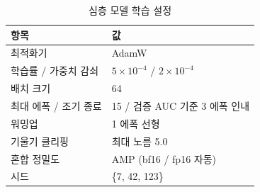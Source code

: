 \begin{table}[htbp]
  \centering
  \caption{심층 모델 학습 설정}
  \label{tab:training}
  \small
  \begin{tabular}{@{}ll@{}}
    \toprule
    항목 & 값 \\
    \midrule
    최적화기 & AdamW \cite{loshchilov2019decoupled} \\
    학습률 / 가중치 감쇠 & $5\times 10^{-4}$ / $2\times 10^{-4}$ \\
    배치 크기 & 64 \\
    최대 에폭 / 조기 종료 & 15 / 검증 AUC 기준 3 에폭 인내 \\
    워밍업 & 1 에폭 선형 \\
    기울기 클리핑 & 최대 노름 5.0 \\
    혼합 정밀도 & AMP (bf16 / fp16 자동) \\
    시드 & \{7, 42, 123\} \\
    \bottomrule
  \end{tabular}
\end{table}
